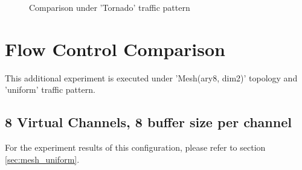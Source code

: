 \begin{figure}[H]
    \centering
    \caption{Comparison under 'Tornado' traffic pattern}
    \label{fig:com_tornado}
\end{figure}


\section{Flow Control Comparison}
This additional experiment is executed under 'Mesh(ary8, dim2)' topology and 'uniform' traffic pattern.


\subsection{8 Virtual Channels, 8 buffer size per channel}
For the experiment results of this configuration, please refer to section \ref{sec:mesh_uniform}.

